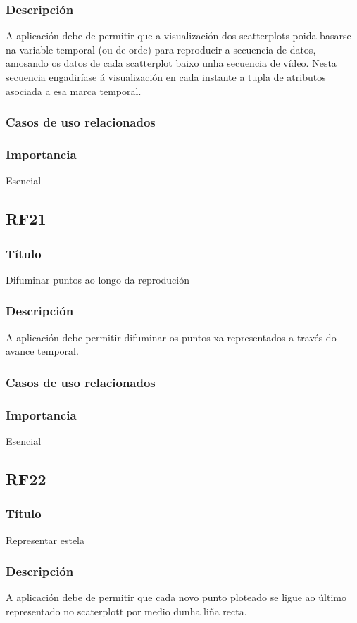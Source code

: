 \subsubsection{Descripción}
A aplicación debe de permitir que a visualización dos scatterplots poida basarse na variable temporal (ou de orde) para reproducir a secuencia de datos, amosando os datos de cada scatterplot baixo unha secuencia de vídeo. Nesta secuencia engadiríase á visualización en cada instante a tupla de atributos asociada a esa marca temporal. 
\subsubsection{Casos de uso relacionados}
\subsubsection{Importancia}
Esencial

\subsection*{RF21}
\subsubsection{Título}
Difuminar puntos ao longo da reprodución
\subsubsection{Descripción}
A aplicación debe permitir difuminar os puntos xa representados a través do avance temporal.
\subsubsection{Casos de uso relacionados}
\subsubsection{Importancia}
Esencial

\subsection*{RF22}
\subsubsection{Título}
Representar estela
\subsubsection{Descripción}
A aplicación debe de permitir que cada novo punto ploteado se ligue ao último representado no scaterplott por medio dunha liña recta.
